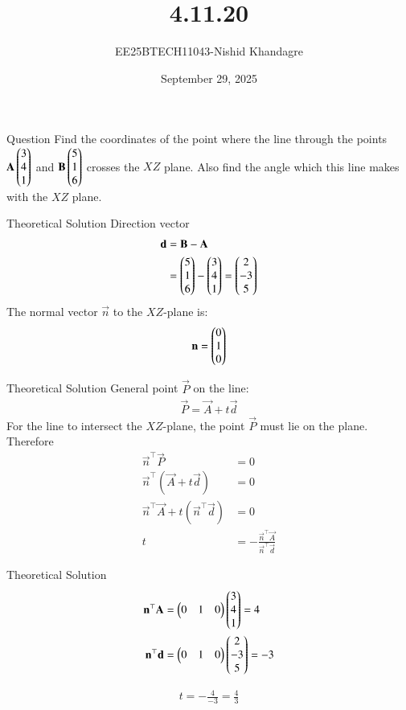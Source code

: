 \documentclass{beamer}
\title
{4.11.20}
\date{September 29, 2025}
\author
{EE25BTECH11043-Nishid Khandagre}
\begin{document}
\frame{\titlepage}
\begin{frame}{Question}
Find the coordinates of the point where the line through the points $\mathbf{A} \begin{pmatrix}3\\4\\1\end{pmatrix}$ and $\mathbf{B}\begin{pmatrix}5\\1\\6\end{pmatrix}$ crosses the $XZ$ plane. Also find the angle which this line makes with the $XZ$ plane.
\end{frame}
\begin{frame}{Theoretical Solution}
Direction vector
\begin{align}
\mathbf{d} &= \mathbf{B} - \mathbf{A}\\
&=\begin{pmatrix}5 \\ 1 \\ 6\end{pmatrix} - \begin{pmatrix}3 \\ 4 \\ 1\end{pmatrix} = \begin{pmatrix}2 \\ -3 \\ 5\end{pmatrix}
\end{align}
The normal vector $\vec{n}$ to the $XZ$-plane is:
\begin{align}
\mathbf{n} = \begin{pmatrix}0 \\ 1 \\ 0\end{pmatrix}
\end{align}
\end{frame}
\begin{frame}{Theoretical Solution}
General point $\vec{P}$ on the line:
\begin{align}
\vec{P} = \vec{A} + t\vec{d}
\end{align}
For the line to intersect the $XZ$-plane, the point $\vec{P}$ must lie on the plane.
Therefore
\begin{align}
\vec{n}^\top\vec{P}&=0\\
\vec{n}^\top(\vec{A} + t\vec{d}) &= 0 \\
\vec{n}^\top \vec{A} + t (\vec{n}^\top \vec{d}) &= 0 \\
t &= -\frac{\vec{n}^\top \vec{A}}{\vec{n}^\top \vec{d}}
\end{align}
\end{frame}
\begin{frame}{Theoretical Solution}
\begin{align}
\mathbf{n}^\top \mathbf{A} &= \begin{pmatrix}0 & 1 & 0\end{pmatrix} \begin{pmatrix}3 \\ 4 \\ 1\end{pmatrix} =4 \\
\mathbf{n}^\top \mathbf{d} &= \begin{pmatrix}0 & 1 & 0\end{pmatrix} \begin{pmatrix}2 \\ -3 \\ 5\end{pmatrix}= -3
\end{align}

\begin{align}
t = -\frac{4}{-3} = \frac{4}{3}
\end{align}
\end{frame}
\end{document}
